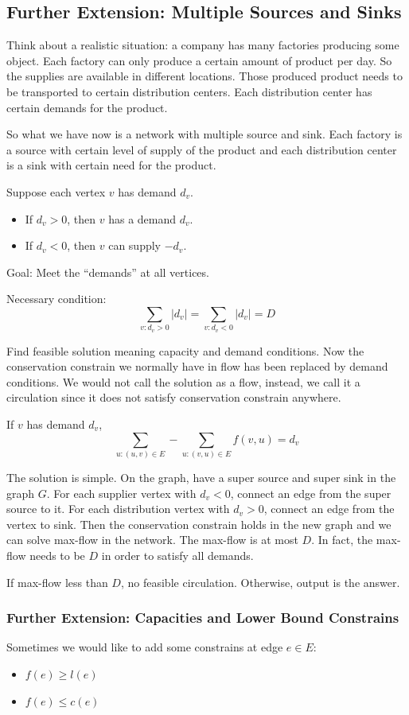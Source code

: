 \subsection{Further Extension: Multiple Sources and Sinks}
Think about a realistic situation: a company has many factories producing some object. Each factory can only produce a certain amount of product per day. So the supplies are available in different locations. Those produced product needs to be transported to certain distribution centers. Each distribution center has certain demands for the product. 

So what we have now is a network with multiple source and sink. Each factory is a source with certain level of supply of the product and each distribution center is a sink with certain need for the product.

Suppose each vertex $v$ has demand $d_v$. 
\begin{itemize}
	\item If $d_v > 0$, then $v$ has a demand $d_v$.
	\item If $d_v < 0$, then $v$ can supply $-d_v$.
\end{itemize}

Goal: Meet the ``demands'' at all vertices.

Necessary condition: \[\sum_{v: d_v > 0}|d_v| = \sum_{v:d_v < 0} |d_v| = D\]

Find feasible solution meaning capacity and demand conditions. Now the conservation constrain we normally have in flow has been replaced by demand conditions. We would not call the solution as a flow, instead, we call it a circulation since it does not satisfy conservation constrain anywhere.

If $v$ has demand $d_v$, \[\sum_{u: (u, v)\in E} - \sum_{u:(v, u)\in E} f(v, u) = d_v\]

The solution is simple. On the graph, have a super source and super sink in the graph $G$. For each supplier vertex with $d_v < 0$, connect an edge from the super source to it. For each distribution vertex with $d_v > 0$, connect an edge from the vertex to sink. Then the conservation constrain holds in the new graph and we can solve max-flow in the network. The max-flow is at most $D$. In fact, the max-flow needs to be $D$ in order to satisfy all demands.

If max-flow less than $D$, no feasible circulation. Otherwise, output is the answer.

\subsubsection{Further Extension: Capacities and Lower Bound Constrains}
Sometimes we would like to add some constrains at edge $e \in E$:
\begin{itemize}
	\item $f(e) \ge l(e)$
	\item $f(e) \le c(e)$
\end{itemize}

